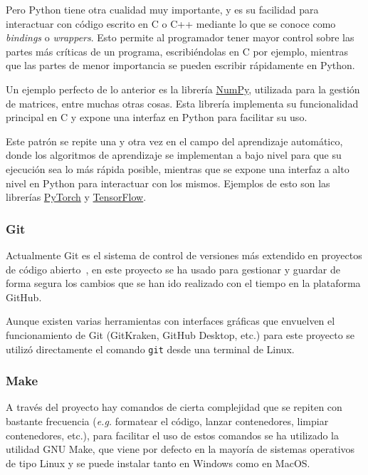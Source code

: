Pero Python tiene otra cualidad muy importante, y es su facilidad para
interactuar con código escrito en C o C++ mediante lo que se conoce como
\textit{bindings} o \textit{wrappers}. Esto permite al programador tener mayor
control sobre las partes más críticas de un programa, escribiéndolas en C por
ejemplo, mientras que las partes de menor importancia se pueden escribir
rápidamente en Python.

Un ejemplo perfecto de lo anterior es la librería
\href{https://github.com/numpy/numpy}{NumPy}, utilizada para la gestión de
matrices, entre muchas otras cosas. Esta librería implementa su funcionalidad
principal en C y expone una interfaz en Python para facilitar su uso.

Este patrón se repite una y otra vez en el campo del aprendizaje automático,
donde los algoritmos de aprendizaje se implementan a bajo nivel para que su
ejecución sea lo más rápida posible, mientras que se expone una interfaz a alto
nivel en Python para interactuar con los mismos. Ejemplos de esto son las
librerías \href{https://github.com/pytorch/pytorch}{PyTorch} y
\href{https://github.com/tensorflow/tensorflow}{TensorFlow}.

\subsubsection{Git}

Actualmente Git es el sistema de control de versiones más extendido en proyectos
de código abierto~\cite{OpenHubVCS}, en este proyecto se ha usado para gestionar
y guardar de forma segura los cambios que se han ido realizado con el tiempo en
la plataforma GitHub.

Aunque existen varias herramientas con interfaces gráficas que envuelven el
funcionamiento de Git (GitKraken, GitHub Desktop, etc.) para este proyecto se
utilizó directamente el comando \texttt{git} desde una terminal de Linux.

\subsubsection{Make}

A través del proyecto hay comandos de cierta complejidad que se repiten con
bastante frecuencia (\textit{e.g.} formatear el código, lanzar contenedores,
limpiar contenedores, etc.), para facilitar el uso de estos comandos se ha
utilizado la utilidad GNU Make, que viene por defecto en la mayoría de sistemas
operativos de tipo Linux y se puede instalar tanto en Windows como en MacOS.

